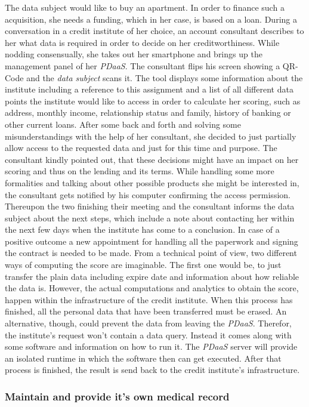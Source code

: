\documentclass[12pt,english,a4paper,titlepage,cleardoublepage=empty,dottedtoc]{report}
\begin{document}
The data subject would like to buy an apartment. In order to finance
such a acquisition, she needs a funding, which in her case, is based on
a loan. During a conversation in a credit institute of her choice, an
account consultant describes to her what data is required in order to
decide on her creditworthiness. While nodding consensually, she takes
out her smartphone and brings up the management panel of her
\emph{PDaaS}. The consultant flips his screen showing a QR-Code and the
\emph{data subject} scans it. The tool displays some information about
the institute including a reference to this assignment and a list of all
different data points the institute would like to access in order to
calculate her scoring, such as address, monthly income, relationship
status and family, history of banking or other current loans. After some
back and forth and solving some misunderstandings with the help of her
consultant, she decided to just partially allow access to the requested
data and just for this time and purpose. The consultant kindly pointed
out, that these decisions might have an impact on her scoring and thus
on the lending and its terms. While handling some more formalities and
talking about other possible products she might be interested in, the
consultant gets notified by his computer confirming the access
permission. Thereupon the two finishing their meeting and the consultant
informs the data subject about the next steps, which include a note
about contacting her within the next few days when the institute has
come to a conclusion. In case of a positive outcome a new appointment
for handling all the paperwork and signing the contract is needed to be
made. From a technical point of view, two different ways of computing
the score are imaginable. The first one would be, to just transfer the
plain data including expire date and information about how reliable the
data is. However, the actual computations and analytics to obtain the
score, happen within the infrastructure of the credit institute. When
this process has finished, all the personal data that have been
transferred must be erased. An alternative, though, could prevent the
data from leaving the \emph{PDaaS}. Therefor, the institute's request
won't contain a data query. Instead it comes along with some software
and information on how to run it. The \emph{PDaaS} server will provide
an isolated runtime in which the software then can get executed. After
that process is finished, the result is send back to the credit
institute's infrastructure.

\subsubsection{Maintain and provide it's own medical
record}\label{maintain-and-provide-its-own-medical-record}
\end{document}
